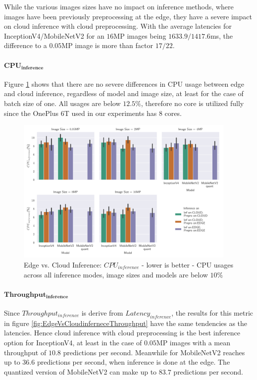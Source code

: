 While the various images sizes have no impact on inference methods, where images have been previously preprocessing at the edge, they have a severe impact on cloud inference with cloud preprocessing.
With the average latencies for InceptionV4/MobileNetV2 for an $16$MP images being $1633.9/1417.6$ms, the difference to a $0.05$MP image is more than factor $17/22$.

\paragraph{$\mathbf{CPU_{inference}}$}
Figure \ref{fig:EdgeVsCloudInferenceCPU} shows that there are no severe differences in CPU usage between edge and cloud inference, regardless of model and image size, at least for the case of batch size of one.
All usages are below $12.5\%$, therefore no core is utilized fully since the OnePlus 6T used in our experiments has $8$ cores.


\begin{figure}[!htb]
\centering
\includegraphics[width=0.95\textwidth]{./Bilder/single_plots/edge_vs_cloud_plots/Edge_vs_Cloud_Inference_Inference_CPU.pdf}
\caption[Edge vs. Cloud Inference:  $CPU_{inference}$ - lower is better]{Edge vs. Cloud Inference:  $CPU_{inference}$ - lower is better -
CPU usages across all inference modes, image sizes and models are below $10\%$}
\label{fig:EdgeVsCloudInferenceCPU}
\end{figure}


\paragraph{$\mathbf{Throughput_{inference}}$}
Since $Throughput_{inference}$ is derive from $Latency_{inference}$, the results for this metric in figure \ref{fig:EdgeVsCloudinferneceThroughput} have the same tendencies as the latencies.
Hence cloud inference with cloud preprocessing is the best inference option for InceptionV4, at least in the case of $0.05$MP images with a mean throughput of $10.8$ predictions per second.
Meanwhile for MobileNetV2 reaches up to $36.6$ predictions per second, when inference is done at the edge.
The quantized version of MobileNetV2 can make up to $83.7$ predictions per second.

